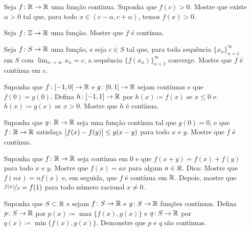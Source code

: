 \begin{exercise} \label{exercise:positivecontneigh}
Seja $f \colon {\mathbb{R}} \to {\mathbb{R}}$ uma função contínua. Suponha que $f(c) > 0$.
Mostre que existe $\alpha > 0$ tal que, para todo $x \in (c-\alpha,c+\alpha)$,
temos $f(x) > 0$.
\end{exercise}

\begin{exercise}
Seja $f \colon {\mathbb{Z}} \to {\mathbb{R}}$ uma função. Mostre que $f$ é contínua.
\end{exercise}

\begin{exercise} \label{exercise:contseqalt}
Seja $f \colon S \to {\mathbb{R}}$ uma função, e seja $c \in S$ tal que, para toda
sequência $\{ x_n \}_{n=1}^\infty$ em $S$ com $\lim_{n\to\infty} x_n = c$,
a sequência $\bigl\{ f(x_n) \bigr\}_{n=1}^\infty$ converge.
Mostre que $f$ é contínua em $c$.
\end{exercise}

\begin{exercise}
Suponha que $f \colon [-1,0] \to {\mathbb{R}}$ e $g \colon [0,1] \to {\mathbb{R}}$ sejam contínuas
e que $f(0) = g(0)$. Defina $h \colon [-1,1] \to {\mathbb{R}}$ por
$h(x) \coloneqq f(x)$ se $x \leq 0$ e $h(x) \coloneqq g(x)$ se $x > 0$.
Mostre que $h$ é contínua.
\end{exercise}

\begin{exercise}
Suponha que $g \colon {\mathbb{R}} \to {\mathbb{R}}$ seja uma função contínua tal que $g(0) = 0$,
e que $f \colon {\mathbb{R}} \to {\mathbb{R}}$ satisfaça
$\bigl\lvert {f(x)-f(y)} \bigr\rvert \leq g(x-y)$ para todo $x$ e $y$.
Mostre que $f$ é contínua.
\end{exercise}

\begin{exercise}[Desafiador]
Suponha que $f \colon {\mathbb{R}} \to {\mathbb{R}}$ seja contínua em $0$ e que
$f(x+y) = f(x) + f(y)$ para todo $x$ e $y$.
Mostre que $f(x) = ax$ para algum $a \in {\mathbb{R}}$.
Dica: Mostre que $f(nx) = nf(x)$ e, em seguida, que $f$ é contínua em ${\mathbb{R}}$.
Depois, mostre que $\nicefrac{f(x)}{x} = f(1)$ para todo número racional $x \neq 0$.
\end{exercise}

\begin{exercise} \label{exercise:minmaxcont}
Suponha que $S \subset {\mathbb{R}}$ e sejam $f \colon S \to {\mathbb{R}}$ e
$g \colon S \to {\mathbb{R}}$ funções contínuas.
Defina $p \colon S \to {\mathbb{R}}$ por
$p(x) \coloneqq \max \bigl\{ f(x) , g(x) \bigr\}$ e
$q \colon S \to {\mathbb{R}}$ por
$q(x) \coloneqq \min \bigl\{ f(x) , g(x) \bigr\}$.
Demonstre que $p$ e $q$ são contínuas.
\end{exercise}

